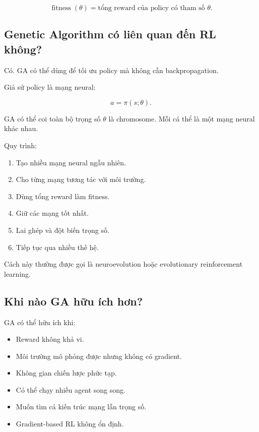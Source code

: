 \documentclass[12pt,a4paper]{report}
\begin{document}
\begin{equation}
\operatorname{fitness}(\theta)
=
\text{tổng reward của policy có tham số }\theta.
\end{equation}

\subsection{Genetic Algorithm có liên quan đến RL không?}

Có. GA có thể dùng để tối ưu policy mà không cần backpropagation.

Giả sử policy là mạng neural:

\begin{equation}
a=\pi(s;\theta).
\end{equation}

GA có thể coi toàn bộ trọng số \(\theta\) là chromosome. Mỗi cá thể là một mạng neural khác nhau.

Quy trình:

\begin{enumerate}[leftmargin=1.8em]
    \item Tạo nhiều mạng neural ngẫu nhiên.
    \item Cho từng mạng tương tác với môi trường.
    \item Dùng tổng reward làm fitness.
    \item Giữ các mạng tốt nhất.
    \item Lai ghép và đột biến trọng số.
    \item Tiếp tục qua nhiều thế hệ.
\end{enumerate}

Cách này thường được gọi là neuroevolution hoặc evolutionary reinforcement learning.

\subsection{Khi nào GA hữu ích hơn?}

GA có thể hữu ích khi:

\begin{itemize}[leftmargin=1.5em]
    \item Reward không khả vi.
    \item Môi trường mô phỏng được nhưng không có gradient.
    \item Không gian chiến lược phức tạp.
    \item Có thể chạy nhiều agent song song.
    \item Muốn tìm cả kiến trúc mạng lẫn trọng số.
    \item Gradient-based RL không ổn định.
\end{itemize}
\end{document}
